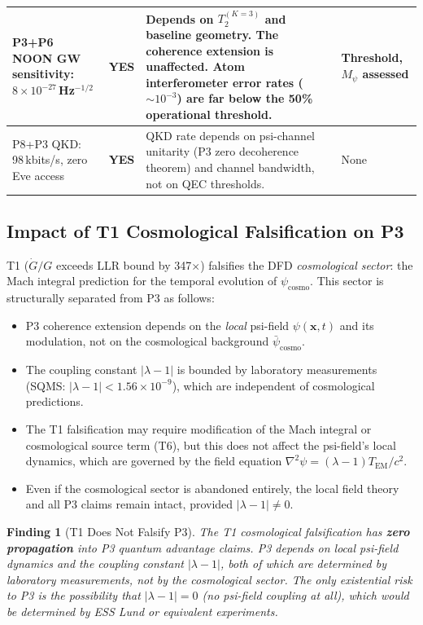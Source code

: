 \documentclass[11pt]{article}
\newtheorem{finding}[theorem]{Finding}
\theoremstyle{definition}
\theoremstyle{remark}
\begin{document}
\begin{longtable}{@{}p{3.5cm}p{2cm}p{5cm}p{2.5cm}@{}}
P3+P6 NOON GW sensitivity: $8\times10^{-27}$\,Hz$^{-1/2}$ &
\textbf{YES} &
Depends on $T_2^{(K=3)}$ and baseline geometry.  The coherence extension
is unaffected.  Atom interferometer error rates ($\sim10^{-3}$) are far
below the 50\% operational threshold. &
Threshold, $M_\psi$ assessed \\
\midrule

P8+P3 QKD: 98\,kbits/s, zero Eve access &
\textbf{YES} &
QKD rate depends on psi-channel unitarity (P3 zero decoherence theorem)
and channel bandwidth, not on QEC thresholds. &
None \\

\bottomrule
\end{longtable}

\subsection{Impact of T1 Cosmological Falsification on P3}
\label{sec:t1-impact}

T1 ($\dot{G}/G$ exceeds LLR bound by 347$\times$) falsifies the DFD
\emph{cosmological sector}: the Mach integral prediction for the temporal
evolution of $\psi_{\mathrm{cosmo}}$.  This sector is structurally
separated from P3 as follows:

\begin{itemize}
  \item P3 coherence extension depends on the \emph{local} psi-field
    $\psi(\mathbf{x}, t)$ and its modulation, not on the cosmological
    background $\bar{\psi}_{\mathrm{cosmo}}$.

  \item The coupling constant $|\lambda-1|$ is bounded by laboratory
    measurements (SQMS: $|\lambda-1| < 1.56\times10^{-9}$), which are
    independent of cosmological predictions.

  \item The T1 falsification may require modification of the Mach integral
    or cosmological source term (T6), but this does not affect the
    psi-field's local dynamics, which are governed by the field equation
    $\nabla^2 \psi = (\lambda-1) T_{\mathrm{EM}} / c^2$.

  \item Even if the cosmological sector is abandoned entirely, the local
    field theory and all P3 claims remain intact, provided $|\lambda-1|
    \neq 0$.
\end{itemize}

\begin{finding}[T1 Does Not Falsify P3]
\label{finding:t1-no-impact}
The T1 cosmological falsification has \textbf{zero propagation} into P3
quantum advantage claims.  P3 depends on local psi-field dynamics and the
coupling constant $|\lambda-1|$, both of which are determined by laboratory
measurements, not by the cosmological sector.  The only existential risk
to P3 is the possibility that $|\lambda-1| = 0$ (no psi-field coupling
at all), which would be determined by ESS Lund or equivalent experiments.
\end{finding}
\end{document}
